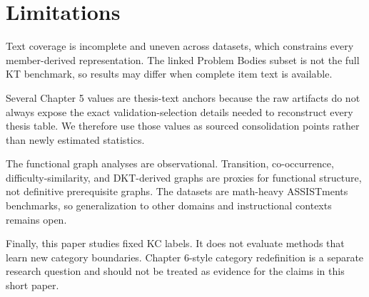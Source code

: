 \section{Limitations}
Text coverage is incomplete and uneven across datasets, which constrains every member-derived representation. The linked Problem Bodies subset is not the full KT benchmark, so results may differ when complete item text is available.

Several Chapter 5 values are thesis-text anchors because the raw artifacts do not always expose the exact validation-selection details needed to reconstruct every thesis table. We therefore use those values as sourced consolidation points rather than newly estimated statistics.

The functional graph analyses are observational. Transition, co-occurrence, difficulty-similarity, and DKT-derived graphs are proxies for functional structure, not definitive prerequisite graphs. The datasets are math-heavy ASSISTments benchmarks, so generalization to other domains and instructional contexts remains open.

Finally, this paper studies fixed KC labels. It does not evaluate methods that learn new category boundaries. Chapter 6-style category redefinition is a separate research question and should not be treated as evidence for the claims in this short paper.
